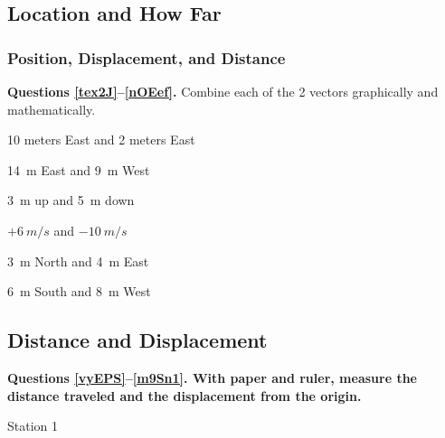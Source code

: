 \documentclass[../main-physics-problems.tex]{subfiles}
\begin{document}
\subsection{Location and How Far}
\subsubsection{Position, Displacement, and Distance}

\begin{questions}

\begin{EnvUplevel}
    \textbf{Questions \ref{tex2J}--\ref{nOEef}.} Combine each of the 2 vectors graphically and mathematically.
\end{EnvUplevel} 

\question \label{tex2J}
10 meters East and 2 meters East

\question
\SI{14}{m} East and \SI{9}{m} West

\question
\SI{3}{m} up and \SI{5}{m} down

\question 
$+\SI{6}{m/s}$ and $-\SI{10}{m/s}$

\question
\SI{3}{m} North and \SI{4}{m} East

\question \label{nOEef}
\SI{6}{m} South and \SI{8}{m} West


\clearpage
\begin{EnvUplevel}
    \subsection{Distance and Displacement}   

    \textbf{Questions \ref{vyEPS}--\ref{m9Sn1}. With paper and ruler, measure the distance traveled and the displacement from the origin.}      
\end{EnvUplevel}

\clearpage

\question \label{vyEPS}
Station 1

\begin{center}
\end{center}

\begin{solution}
\begin{center}
\end{center}


\end{solution}
\end{questions}
\end{document}
